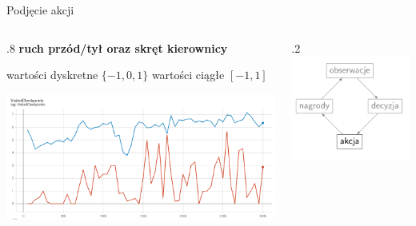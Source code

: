 \begin{frame}{Podjęcie akcji}
	
	\begin{columns}
		\begin{column}{.8\hsize}
			\textbf{ruch przód/tył oraz skręt kierownicy}
			\begin{itemize}
				\myitem wartości dyskretne $\{-1, 0, 1\}$
				\myitem wartości ciągłe $[-1, 1]$
			\end{itemize}
			
			\vspace{1cm}
			{\hspace*{2cm}\includegraphics[width=.8\linewidth]{figures/output_values_compare.png}}
		\end{column}

		\begin{column}{.2\hsize}
			\includegraphics[width=\linewidth]{figures/learning_loop_3.png}
			\vspace{5cm}
		\end{column}
	\end{columns}
	
\end{frame}
